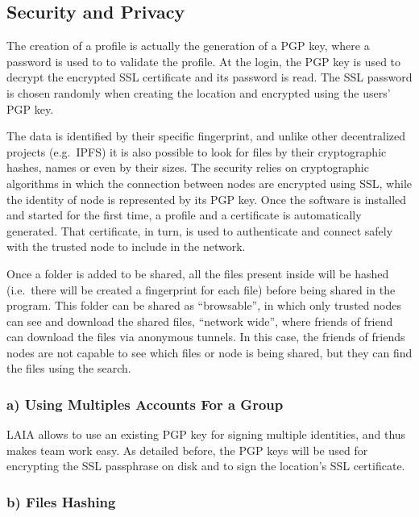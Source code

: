 \documentclass[conference,final,]{IEEEtran}
\begin{document}
\hypertarget{security-and-privacy}{%
\subsection{Security and Privacy}\label{security-and-privacy}}

The creation of a profile is actually the generation of a PGP key, where
a password is used to to validate the profile. At the login, the PGP key
is used to decrypt the encrypted SSL certificate and its password is
read. The SSL password is chosen randomly when creating the location and
encrypted using the users' PGP key.

The data is identified by their specific fingerprint, and unlike other
decentralized projects (e.g.~IPFS) it is also possible to look for files
by their cryptographic hashes, names or even by their sizes. The
security relies on cryptographic algorithms in which the connection
between nodes are encrypted using SSL, while the identity of node is
represented by its PGP key. Once the software is installed and started
for the first time, a profile and a certificate is automatically
generated. That certificate, in turn, is used to authenticate and
connect safely with the trusted node to include in the network.

Once a folder is added to be shared, all the files present inside will
be hashed (i.e.~there will be created a fingerprint for each file)
before being shared in the program. This folder can be shared as
``browsable'', in which only trusted nodes can see and download the
shared files, ``network wide'', where friends of friend can download the
files via anonymous tunnels. In this case, the friends of friends nodes
are not capable to see which files or node is being shared, but they can
find the files using the search.

\hypertarget{a-using-multiples-accounts-for-a-group}{%
\subsubsection{a) Using Multiples Accounts For a
Group}\label{a-using-multiples-accounts-for-a-group}}

LAIA allows to use an existing PGP key for signing multiple identities,
and thus makes team work easy. As detailed before, the PGP keys will be
used for encrypting the SSL passphrase on disk and to sign the
location's SSL certificate.

\hypertarget{b-files-hashing}{%
\subsubsection{b) Files Hashing}\label{b-files-hashing}}
\end{document}
